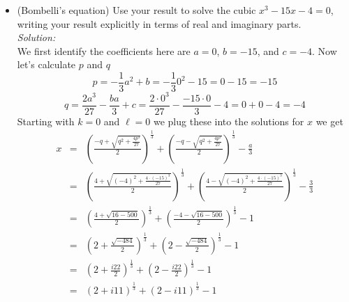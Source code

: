 \documentclass[10pt]{amsart}
\theoremstyle{nonumberplain}
\begin{document}
\begin{enumerate}[label={\bf {\arabic*}:}]
\begin{itemize}
\item (Bombelli's equation) Use your result to solve the cubic $x^3-15
  x-4=0$, writing your result explicitly in terms of real and
  imaginary parts. \\
\textit{Solution:} \\
We first identify the coefficients here are $a=0$, $b=-15$, and $c=-4$.
Now let's calculate $p$ and $q$
$$p = -\frac{1}{3}a^2 + b = -\frac{1}{3}0^2 -15 = 0 -15 = -15$$
$$q = \frac{2a^3}{27} - \frac{ba}{3} + c = \frac{2 \cdot 0^3}{27} - \frac{-15 \cdot 0}{3} - 4 = 0 + 0 -4 = -4$$
Starting with $k = 0$ and $\ell = 0$ we plug these into the solutions for $x$ we get
\begin{eqnarray*}
x &=& \left(\frac{-q + \sqrt{q^2 + \frac{4p^3}{27}}}{2}\right)^{\frac{1}{3}} + \left(\frac{-q - \sqrt{q^2 + \frac{4p^3}{27}}}{2}\right)^{\frac{1}{3}} -\frac{a}{3} \\
   &=& \left(\frac{4 + \sqrt{(-4)^2 + \frac{4 \cdot (-15)^3}{27}}}{2}\right)^{\frac{1}{3}} + \left(\frac{4 - \sqrt{(-4)^2 + \frac{4 \cdot (-15)^3}{27}}}{2}\right)^{\frac{1}{3}} -\frac{3}{3} \\
   &=& \left(\frac{4 + \sqrt{16 - 500}}{2}\right)^{\frac{1}{3}} + \left(\frac{-4 - \sqrt{16 - 500}}{2}\right)^{\frac{1}{3}} -1 \\
   &=& \left(2 + \frac{\sqrt{-484}}{2}\right)^{\frac{1}{3}} + \left(2 - \frac{\sqrt{-484}}{2}\right)^{\frac{1}{3}} -1 \\
   &=& \left(2 + \frac{i22}{2}\right)^{\frac{1}{3}} + \left(2 - \frac{i22}{2}\right)^{\frac{1}{3}} -1 \\
   &=& \left(2 + i11\right)^{\frac{1}{3}} + \left(2 - i11\right)^{\frac{1}{3}} -1 \\
\end{eqnarray*}


\end{itemize}
\end{enumerate}
\end{document}
